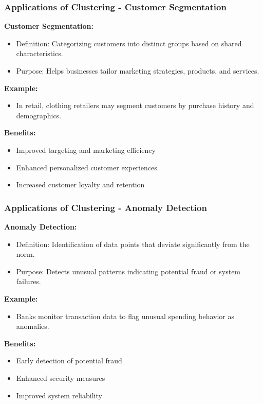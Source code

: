 \documentclass[aspectratio=169]{beamer}
\begin{document}
\begin{frame}[fragile]
    \frametitle{Applications of Clustering - Customer Segmentation}
    \textbf{Customer Segmentation:}
    \begin{itemize}
        \item Definition: Categorizing customers into distinct groups based on shared characteristics.
        \item Purpose: Helps businesses tailor marketing strategies, products, and services.
    \end{itemize}

    \textbf{Example:}
    \begin{itemize}
        \item In retail, clothing retailers may segment customers by purchase history and demographics.
    \end{itemize}
    
    \textbf{Benefits:}
    \begin{itemize}
        \item Improved targeting and marketing efficiency
        \item Enhanced personalized customer experiences
        \item Increased customer loyalty and retention
    \end{itemize}
\end{frame}

\begin{frame}[fragile]
    \frametitle{Applications of Clustering - Anomaly Detection}
    \textbf{Anomaly Detection:}
    \begin{itemize}
        \item Definition: Identification of data points that deviate significantly from the norm.
        \item Purpose: Detects unusual patterns indicating potential fraud or system failures.
    \end{itemize}

    \textbf{Example:}
    \begin{itemize}
        \item Banks monitor transaction data to flag unusual spending behavior as anomalies.
    \end{itemize}

    \textbf{Benefits:}
    \begin{itemize}
        \item Early detection of potential fraud
        \item Enhanced security measures
        \item Improved system reliability
    \end{itemize}
\end{frame}
\end{document}

